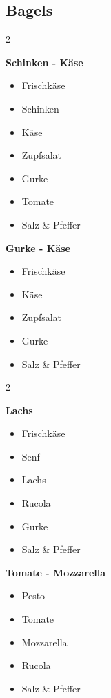 \documentclass[12pt]{article}
\begin{document}
\clearpage
\subsection{Bagels}

\begin{multicols}{2}

\textbf{Schinken - Käse }
\begin{itemize}[itemsep=1pt, topsep=5pt]
\item Frischkäse
\item Schinken
\item Käse
\item Zupfsalat
\item Gurke
\item Tomate
\item Salz \& Pfeffer
\end{itemize}
\columnbreak

\textbf{Gurke - Käse }
\begin{itemize}[itemsep=1pt, topsep=5pt]
\item Frischkäse
\item Käse
\item Zupfsalat
\item Gurke
\item Salz \& Pfeffer
\end{itemize}

\end{multicols}
\begin{multicols}{2}

\textbf{Lachs}
\begin{itemize}[itemsep=1pt, topsep=5pt]
\item Frischkäse
\item Senf
\item Lachs
\item Rucola
\item Gurke
\item Salz \& Pfeffer
\end{itemize}
\columnbreak

\textbf{Tomate - Mozzarella}
\begin{itemize}[itemsep=1pt, topsep=5pt]
\item Pesto
\item Tomate
\item Mozzarella
\item Rucola
\item Salz \& Pfeffer
\end{itemize}
\end{multicols}
\end{document}
